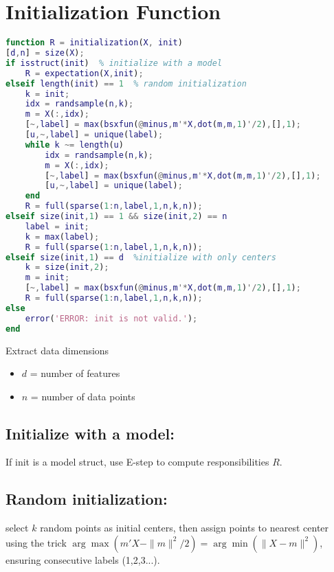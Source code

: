 \documentclass[11pt]{article}
\begin{document}
\vspace{0.5cm}

\section{Initialization Function}

\begin{minipage}{\textwidth}
\begin{minipage}[t]{0.48\textwidth}
\begin{lstlisting}[language=Matlab, firstnumber=56]
function R = initialization(X, init)
[d,n] = size(X);
if isstruct(init)  % initialize with a model
    R = expectation(X,init);
elseif length(init) == 1  % random initialization
    k = init;
    idx = randsample(n,k);
    m = X(:,idx);
    [~,label] = max(bsxfun(@minus,m'*X,dot(m,m,1)'/2),[],1);
    [u,~,label] = unique(label);
    while k ~= length(u)
        idx = randsample(n,k);
        m = X(:,idx);
        [~,label] = max(bsxfun(@minus,m'*X,dot(m,m,1)'/2),[],1);
        [u,~,label] = unique(label);
    end
    R = full(sparse(1:n,label,1,n,k,n));
elseif size(init,1) == 1 && size(init,2) == n
    label = init;
    k = max(label);
    R = full(sparse(1:n,label,1,n,k,n));
elseif size(init,1) == d  %initialize with only centers
    k = size(init,2);
    m = init;
    [~,label] = max(bsxfun(@minus,m'*X,dot(m,m,1)'/2),[],1);
    R = full(sparse(1:n,label,1,n,k,n));
else
    error('ERROR: init is not valid.');
end
\end{lstlisting}
\end{minipage}
\hfill
\begin{minipage}[t]{0.48\textwidth}

Extract data dimensions
\begin{itemize}
\item $d$ = number of features
\item $n$ = number of data points
\end{itemize}

\subsection{Initialize with a model:} If init is a model struct, use E-step to compute responsibilities $R$.

\subsection{Random initialization:} select $k$ random points as initial centers, then assign points to nearest center using the trick $\arg\max(m'X - \|m\|^2/2) = \arg\min(\|X-m\|^2)$, ensuring consecutive labels (1,2,3...).


\end{minipage}
\end{minipage}
\end{document}
